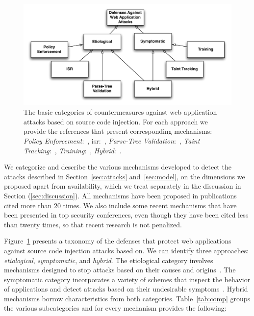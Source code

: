\documentclass[conference]{IEEEtran}
\begin{document}
\begin{figure} [ht]
\begin{center}
\leavevmode
\includegraphics[scale=0.65]{defenses.pdf}
\end{center}
\caption{\label{fig:defenses}The basic categories of countermeasures
against web application attacks based on source code
injection. For each approach we provide the references
that present corresponding mechanisms:
{\it Policy Enforcement}:~\cite{NSS06,JKK06a,KKVJ06,KJKV09,TNH07,RDWDE07,YCIS07,OWVS08,PSC09,ML10,DDHPJ10,PS11,VDDPJ11,BV08},
{\sc isr}:~\cite{BK04,JB07,GC09,APKLM10},
{\it Parse-Tree Validation}:~\cite{BWS05,SW06},
{\it Taint Tracking}:~\cite{HCF05,PB05,XBS06,NLC07,VFJKKV07,PMP11,SLMS14},
{\it Training}:~\cite{LLW02,HO05,HO06,HO05b,VMV05,JEP08,WPLKK09,MS09,MKS09,MKLS11},
{\it Hybrid}:~\cite{BV08,LV09,SMS13}.}
\end{figure}

We categorize and describe the various mechanisms developed to detect
the attacks described in Section~\ref{sec:attacks} and~\ref{sec:model},
on the dimensions we proposed apart from availability, which we treat
separately in the discussion in Section (\ref{sec:discussion}).
All mechanisms have been proposed in publications cited more than
20 times. We also include some recent mechanisms that have been
presented in top security conferences, even though they have been
cited less than twenty times, so that recent research is not penalized.

Figure~\ref{fig:defenses} presents a taxonomy of the
defenses that protect web applications against
source code injection attacks based on.
We can identify three approaches:
{\it etiological}, {\it symptomatic}, and {\it hybrid}.
The etiological category involves mechanisms designed to
stop attacks based on their causes and origins~\cite{JL75,L81}. 
The symptomatic category incorporates a variety of schemes that
inspect the behavior of applications and detect attacks based on
their undesirable symptoms~\cite{D76,A00}.
Hybrid mechanisms borrow characteristics from both
categories. Table~\ref{tab:comp} groups the various subcategories and
for every mechanism provides the following:
\end{document}
